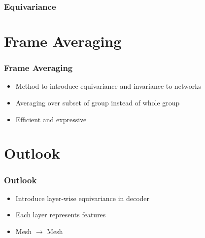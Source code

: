\documentclass{beamer}
\begin{document}
\begin{frame}
\frametitle{Equivariance}
\begin{figure}[h]
\end{figure}
\end{frame}


\section{Frame Averaging}
\begin{frame}
\frametitle{Frame Averaging}
\begin{itemize}
\item<2-> Method to introduce equivariance and invariance to networks
\bigskip
\item<3-> Averaging over subset of group instead of whole group
\bigskip
\item<4-> Efficient and expressive
\end{itemize}
\end{frame}

\section{Outlook}
\begin{frame}
\frametitle{Outlook}
\begin{itemize}
\item<2-> Introduce layer-wise equivariance in decoder
\bigskip
\item<3-> Each layer represents features
\bigskip
\item<4-> Mesh $\rightarrow$ Mesh
\end{itemize}
\end{frame}
\end{document}

